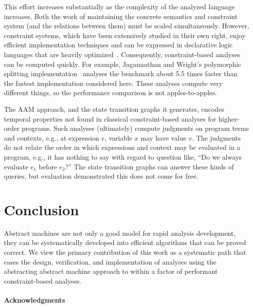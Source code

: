 \documentclass[9pt]{sigplanconf} %
\begin{document}
This effort increases substantially as the complexity of the analyzed language increases.
%
Both the work of maintaining the concrete semantics and constraint system (and the relations between them) must be scaled simultaneously.
%
However, constraint systems, which have been extensively studied in their own right, enjoy efficient implementation techniques and can be expressed in declarative logic languages that are heavily optimized~\cite{dvanhorn:bravenboer-smaragdakis-oopsla09}.
%
Consequently, constraint-based analyses can be computed quickly.
%
For example, Jagannathan and Wright's polymorphic splitting implementation~\cite{dvanhorn:wright-jagannathan-toplas98} analyses the \Church{} benchmark about 5.5 times faster than the fastest implementation considered here.
%
These analyses compute very different things, so the performance comparison is not apples-to-apples.

The AAM approach, and the state transition graphs it generates, encodes temporal properties not found in classical constraint-based analyses for higher-order programs.
%
Such analyses (ultimately) compute judgments on program terms and contexts, e.g., at expression $e$, variable $x$ may have value $v$.
%
The judgments do not relate the order in which expressions and context may be evaluated in a program, e.g., it has nothing to say with regard to question like,
%
``Do we always evaluate $e_1$ before $e_2$?''%
%
%
The state transition graphs can answer these kinds of queries, but evaluation demonstrated this does not come for free.

\section{Conclusion}
\label{sec:conclusion}

Abstract machines are not only a good model for rapid analysis development, they can be systematically developed into efficient algorithms that can be proved correct.
%
We view the primary contribution of this work as a systematic path that eases the design, verification, and implementation of analyses using the abstracting abstract machine approach to within a factor of performant constraint-based analyses.


\paragraph{Acknowledgments}
\end{document}
